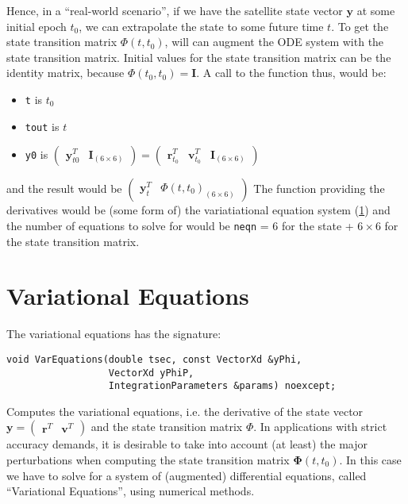 Hence, in a ``real-world scenario'', if we have the satellite state vector 
$\bm{y}$ at some initial epoch $t_0$, we can extrapolate the state to some 
future time $t$. To get the state transition matrix $\Phi (t,t_0)$, will can 
augment the ODE system with the state transition matrix. Initial values for 
the state transition matrix can be the identity matrix, because 
$\Phi (t_0,t_0) = \bm{I}$. A call to the function thus, would be:
\begin{itemize}
    \item \texttt{t} is $t_0$
    \item \texttt{tout} is $t$
    \item \texttt{y0} is 
    $\begin{pmatrix} \bm{y}^T_{t0} & \bm{I}_{(6 \times 6)} \end{pmatrix} = 
    \begin{pmatrix} \bm{r}^T_{t_0} & \bm{v}^T_{t_0} & \bm{I}_{(6 \times 6)} \end{pmatrix}$
\end{itemize}
and the result would be 
$\begin{pmatrix} \bm{y}^T_{t} & \Phi(t,t_0)_{(6 \times 6)} \end{pmatrix}$
The function providing the derivatives would be (some form of) the 
variatiational equation system (\ref{sec:variational-equations}) and the number 
of equations to solve for would be \texttt{neqn} = $6$ for the state + $6 \times 6$ for 
the state transition matrix.


\section{Variational Equations}
\label{sec:variational-equations}
The variational equations has the signature:

\begin{lstlisting}
void VarEquations(double tsec, const VectorXd &yPhi,
                  VectorXd yPhiP,
                  IntegrationParameters &params) noexcept;
\end{lstlisting}

Computes the variational equations, i.e. the derivative of the state vector 
$\bm{y} = \begin{pmatrix}\bm{r}^T & \bm{v}^T \end{pmatrix}$ and the state 
transition matrix $\Phi$. In applications with strict accuracy demands, it is 
desirable to take into account (at least) the major perturbations when computing 
the state transition matrix $\bm{\Phi}(t,t_0)$. In this case we have to solve 
for a system of (augmented) differential equations, called ``Variational Equations'', 
using numerical methods.

